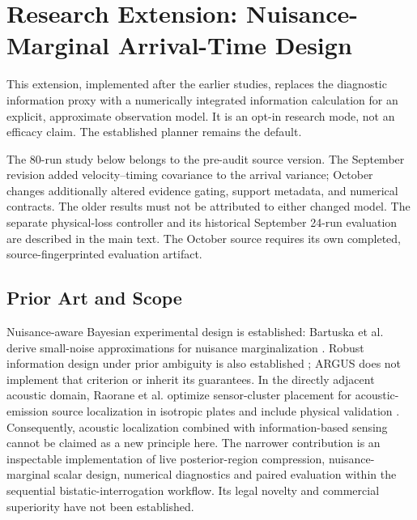 \section{Research Extension: Nuisance-Marginal Arrival-Time Design}
\label{sec:nuisance-design}
This extension, implemented after the earlier studies, replaces the diagnostic
information proxy with a numerically integrated information calculation for an
explicit, approximate observation model. It is an opt-in research mode, not an
efficacy claim. The established planner remains the default.

The 80-run study below belongs to the pre-audit source version. The September
revision added velocity--timing covariance to the arrival variance; October
changes additionally altered evidence gating, support metadata, and numerical
contracts. The older results must not be attributed to either changed model.
The separate physical-loss controller and its historical September 24-run
evaluation are described in the main text. The October source requires its own
completed, source-fingerprinted evaluation artifact.

\subsection{Prior Art and Scope}
Nuisance-aware Bayesian experimental design is established: Bartuska et al.
derive small-noise approximations for nuisance marginalization
\cite{bartuska2022nuisance}. Robust information design under prior ambiguity is
also established \cite{go2022robust}; ARGUS does not implement that criterion or
inherit its guarantees. In the directly adjacent acoustic domain, Raorane et al.
optimize sensor-cluster placement for acoustic-emission source localization in
isotropic plates and include physical validation \cite{raorane2024placement}.
Consequently, acoustic localization combined with information-based sensing
cannot be claimed as a new principle here. The narrower contribution is an
inspectable implementation of live posterior-region compression,
nuisance-marginal scalar design, numerical diagnostics and paired evaluation
within the sequential bistatic-interrogation workflow. Its legal novelty and
commercial superiority have not been established.

